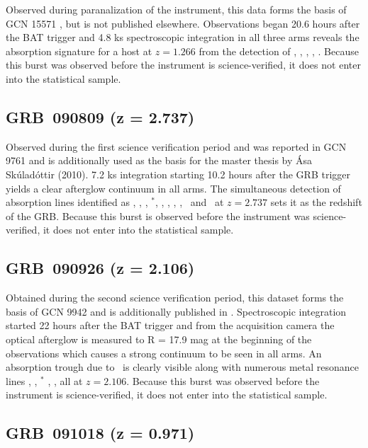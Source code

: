\documentclass{aa}    %
\begin{document}
Observed during paranalization of the instrument, this data forms the basis of
GCN 15571 \citep{GCN15571}, but is not published elsewhere. Observations began
20.6 hours after the BAT trigger and 4.8 ks spectroscopic integration in all
three arms reveals the absorption signature for a host at $z = 1.266$ from the
detection of \mgii, \mgi, \SIii, \feii, \aliii. Because this burst was observed
before the instrument is science-verified, it does not enter into the
statistical sample.

\subsection{GRB~090809 (z = 2.737)} \label{090809}

Observed during the first science verification period and was reported in GCN
9761 \citep{GCN.9761} and is additionally used as the basis for the master
thesis by \'Asa Sk\'ulad\'ottir (2010). 7.2 ks integration starting 10.2 hours
after the GRB trigger yields a clear afterglow continuum in all arms. The
simultaneous detection of absorption lines identified as \lya, \SIii, \oi,
\SIi$^*$, \SIiv, \civ, \feii, \alii, \aliii~and \mgii~at $z = 2.737$ sets it as
the redshift of the GRB. Because this burst is observed before the instrument
was science-verified, it does not enter into the statistical sample.

\subsection{GRB~090926 (z = 2.106)} \label{090926}

Obtained during the second science
verification period, this dataset forms the basis of GCN 9942 \citep{GCN.9942} and is
additionally published in \citet{DElia2010}. Spectroscopic integration started
22 hours after the BAT trigger and from the acquisition camera the optical
afterglow is measured to R = 17.9 mag at the beginning of the observations which
causes a strong continuum to be seen in all arms. An absorption trough due to
\lya~is clearly visible along with numerous metal resonance lines \civ, \SIii,
\SIii$^*$ \feii, \mgii, all at $z = 2.106$. Because this burst was observed
before the instrument is science-verified, it does not enter into the
statistical sample.

\subsection{GRB~091018 (z = 0.971)}\label{091018}
\end{document}
